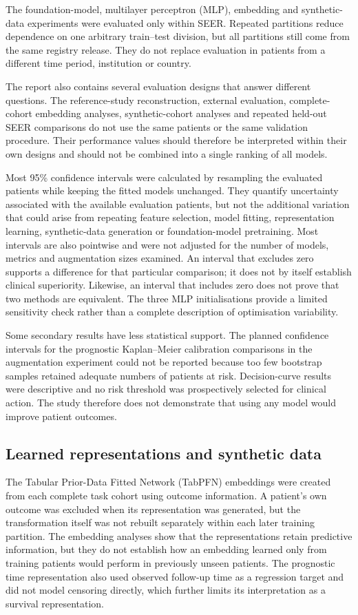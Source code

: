 The foundation-model, multilayer perceptron (MLP), embedding and synthetic-data
experiments were evaluated only within SEER. Repeated partitions reduce
dependence on one arbitrary train--test division, but all partitions still come
from the same registry release. They do not replace evaluation in patients from
a different time period, institution or country.

The report also contains several evaluation designs that answer different
questions. The reference-study reconstruction, external evaluation, complete-
cohort embedding analyses, synthetic-cohort analyses and repeated held-out
SEER comparisons do not use the same patients or the same validation procedure.
Their performance values should therefore be interpreted within their own
designs and should not be combined into a single ranking of all models.

Most 95\% confidence intervals were calculated by resampling the evaluated
patients while keeping the fitted models unchanged. They quantify uncertainty
associated with the available evaluation patients, but not the additional
variation that could arise from repeating feature selection, model fitting,
representation learning, synthetic-data generation or foundation-model
pretraining. Most intervals are also pointwise and were not adjusted for the
number of models, metrics and augmentation sizes examined. An interval that
excludes zero supports a difference for that particular comparison; it does not
by itself establish clinical superiority. Likewise, an interval that includes
zero does not prove that two methods are equivalent. The three MLP
initialisations provide a limited sensitivity check rather than a complete
description of optimisation variability.

Some secondary results have less statistical support. The planned confidence
intervals for the prognostic Kaplan--Meier calibration comparisons in the
augmentation experiment could not be reported because too few bootstrap
samples retained adequate numbers of patients at risk. Decision-curve results
were descriptive and no risk threshold was prospectively selected for clinical
action. The study therefore does not demonstrate that using any model would
improve patient outcomes.

\subsection{Learned representations and synthetic data}

The Tabular Prior-Data Fitted Network (TabPFN) embeddings were created from each
complete task cohort using outcome information. A patient's own outcome was
excluded when its representation was generated, but the transformation itself
was not rebuilt separately within each later training partition. The embedding
analyses show that the representations retain predictive information, but they
do not establish how an embedding learned only from training patients would
perform in previously unseen patients. The prognostic time representation also
used observed follow-up time as a regression target and did not model censoring
directly, which further limits its interpretation as a survival representation.

